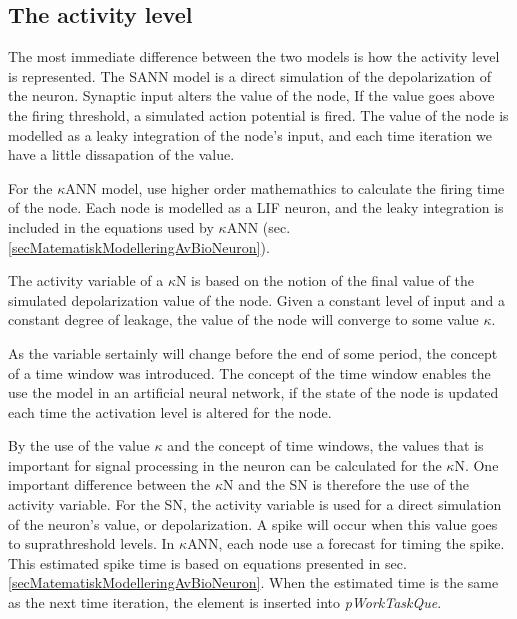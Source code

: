 	\subsection{The activity level}
	
	The most immediate difference between the two models is how the activity level is represented.
	The SANN model is a direct simulation of the depolarization of the neuron. 
	Synaptic input alters the value of the node, 
	If the value goes above the firing threshold, a simulated action potential is fired.
	The value of the node is modelled as a leaky integration of the node's input, and each time iteration we have a little dissapation of the value.

	For the $\kappa$ANN model, use higher order mathemathics to calculate the firing time of the node.
	Each node is modelled as a LIF neuron, and the leaky integration is included in the equations used by $\kappa$ANN (sec. \ref{secMatematiskModelleringAvBioNeuron}).
	
	The activity variable of a $\kappa$N is based on the notion of the final value of the simulated depolarization value of the node.
	Given a constant level of input and a constant degree of leakage, the value of the node will converge to some value $\kappa$.

	As the variable sertainly will change before the end of some period, the concept of a time window was introduced.
	The concept of the time window enables the use the model in an artificial neural network, if the state of the node is updated each time the activation level is altered for the node.

	By the use of the value $\kappa$ and the concept of time windows, the values that is important for signal processing in the neuron can be calculated for the $\kappa$N.
	One important difference between the $\kappa$N and the SN is therefore the use of the activity variable.
	For the SN, the activity variable is used for a direct simulation of the neuron's value, or depolarization.
	A spike will occur when this value goes to suprathreshold levels.
	In $\kappa$ANN, each node use a forecast for timing the spike.
	This estimated spike time is based on equations presented in sec. \ref{secMatematiskModelleringAvBioNeuron}. %
	When the estimated time is the same as the next time iteration, the element is inserted into \emph{pWorkTaskQue}.


